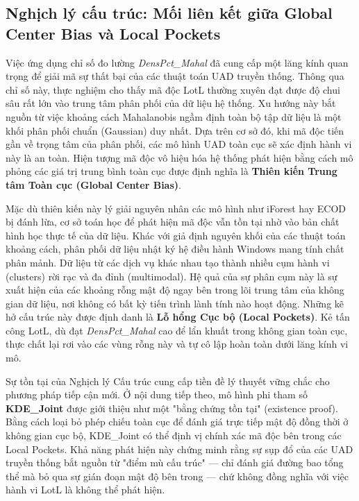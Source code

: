\documentclass[../main.tex]{subfiles}
\begin{document}
\subsection{Nghịch lý cấu trúc: Mối liên kết giữa Global Center Bias và Local Pockets}

Việc ứng dụng chỉ số đo lường \textit{DensPct\_Mahal} đã cung cấp một lăng kính quan trọng để giải mã sự thất bại của các thuật toán UAD truyền thống. Thông qua chỉ số này, thực nghiệm cho thấy mã độc LotL thường xuyên đạt được độ chui sâu rất lớn vào trung tâm phân phối của dữ liệu hệ thống. Xu hướng này bắt nguồn từ việc khoảng cách Mahalanobis ngầm định toàn bộ tập dữ liệu là một khối phân phối chuẩn (Gaussian) duy nhất. Dựa trên cơ sở đó, khi mã độc tiến gần về trọng tâm của phân phối, các mô hình UAD toàn cục sẽ xác định hành vi này là an toàn. Hiện tượng mã độc vô hiệu hóa hệ thống phát hiện bằng cách mô phỏng các giá trị trung bình toàn cục được định nghĩa là \textbf{Thiên kiến Trung tâm Toàn cục (Global Center Bias)}.

Mặc dù thiên kiến này lý giải nguyên nhân các mô hình như iForest hay ECOD bị đánh lừa, cơ sở toán học để phát hiện mã độc vẫn tồn tại nhờ vào bản chất hình học thực tế của dữ liệu. Khác với giả định nguyên khối của các thuật toán khoảng cách, phân phối dữ liệu nhật ký hệ điều hành Windows mang tính chất phân mảnh. Dữ liệu từ các dịch vụ khác nhau tạo thành nhiều cụm hành vi (clusters) rời rạc và đa đỉnh (multimodal). Hệ quả của sự phân cụm này là sự xuất hiện của các khoảng rỗng mật độ ngay bên trong lõi trung tâm của không gian dữ liệu, nơi không có bất kỳ tiến trình lành tính nào hoạt động. Những kẽ hở cấu trúc này được định danh là \textbf{Lỗ hổng Cục bộ (Local Pockets)}. Kẻ tấn công LotL, dù đạt \textit{DensPct\_Mahal} cao để lẩn khuất trong không gian toàn cục, thực chất lại rơi vào các vùng rỗng này và tự cô lập hoàn toàn dưới lăng kính vi mô.

Sự tồn tại của Nghịch lý Cấu trúc cung cấp tiền đề lý thuyết vững chắc cho phương pháp tiếp cận mới. Ở nội dung tiếp theo, mô hình phi tham số \textbf{KDE\_Joint} được giới thiệu như một "bằng chứng tồn tại" (existence proof). Bằng cách loại bỏ phép chiếu toàn cục để đánh giá trực tiếp mật độ đồng thời ở không gian cục bộ, KDE\_Joint có thể định vị chính xác mã độc bên trong các Local Pockets. Khả năng phát hiện này chứng minh rằng sự sụp đổ của các UAD truyền thống bắt nguồn từ "điểm mù cấu trúc" — chỉ đánh giá đường bao tổng thể mà bỏ qua sự gián đoạn mật độ bên trong — chứ không đồng nghĩa với việc hành vi LotL là không thể phát hiện.
\end{document}
